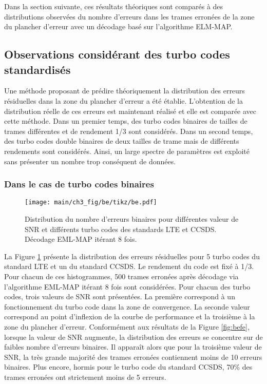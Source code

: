 Dans la section suivante, ces résultats théoriques sont comparés à des distributions observées du nombre d'erreurs dans les
trames erronées de la zone du plancher d'erreur avec un décodage basé sur l'algorithme ELM-MAP.

\subsection{Observations considérant des turbo codes standardisés}
Une méthode proposant de prédire théoriquement la distribution des erreurs résiduelles dans la zone du plancher d'erreur 
a été  établie. L'obtention 
de la distribution réelle de ces erreurs est maintenant réalisé et elle est comparée avec cette méthode. Dans un premier 
temps, des turbo codes binaires de tailles de 
trames différentes et de rendement 1/3 sont considérés. Dans un second temps, des turbo codes double binaires de deux
tailles de trame mais de différents rendements sont considérés. Ainsi, un large spectre de paramètres est exploité sans
présenter un nombre trop conséquent de données.

\subsubsection{Dans le cas de turbo codes binaires}
\begin{figure}[!ht]
	\centering
	\hspace*{-1cm}
	\texttt{[image: main/ch3\_fig/be/tikz/be.pdf]}
	\caption{Distribution du nombre d'erreurs binaires pour différentes valeur de SNR et différents turbo codes des 
	standards LTE et CCSDS. 
	Décodage EML-MAP itérant 8 fois. \label{fig:be}}
\end{figure}

La Figure \ref{fig:be} présente la distribution des erreurs résiduelles pour 5 turbo codes du standard LTE et un du 
standard CCSDS. Le rendement du code est fixé à 1/3. Pour chacun de ces histogrammes, 500 trames erronées
après décodage via l'algorithme EML-MAP itérant 8 fois sont considérées. 
Pour chacun des turbo codes, trois valeurs de SNR sont présentées. La première correspond à un fonctionnement du turbo 
code dans la zone de convergence. La seconde valeur correspond au point d'inflexion de la courbe de performance et la troisième à la
zone du plancher d'erreur. Conformément aux résultats de la Figure \ref{fig:befe}, lorsque la valeur de SNR augmente, la 
distribution des erreurs se concentre sur de faibles nombre d'erreurs binaires.
Il apparaît alors que pour la troisième valeur de SNR, la très grande majorité 
des trames erronées contiennent moins de 10 erreurs binaires. 
Plus encore, hormis pour le turbo code du standard CCSDS, 70\% des trames erronées ont strictement moins de 5 erreurs.

